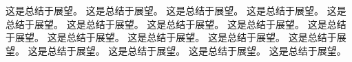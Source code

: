 这是总结于展望。
这是总结于展望。
这是总结于展望。
这是总结于展望。
这是总结于展望。
这是总结于展望。
这是总结于展望。
这是总结于展望。
这是总结于展望。
这是总结于展望。
这是总结于展望。
这是总结于展望。
这是总结于展望。
这是总结于展望。
这是总结于展望。
这是总结于展望。
这是总结于展望。

